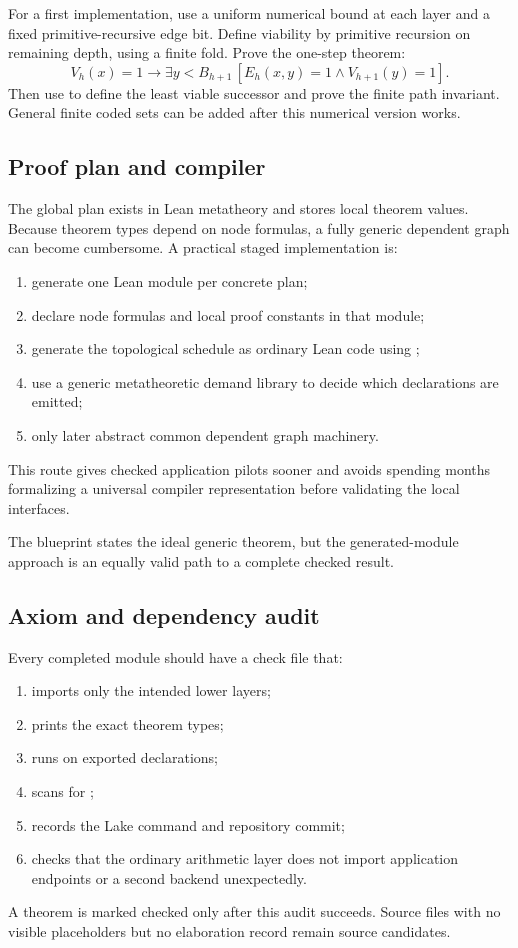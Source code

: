 For a first implementation, use a uniform numerical bound at each layer and a
fixed primitive-recursive edge bit.  Define viability by primitive recursion on
remaining depth, using a finite  fold.  Prove the one-step theorem:
\[
  V_h(x)=1\to
  \exists y<B_{h+1}\,[E_h(x,y)=1\wedge V_{h+1}(y)=1].
\]
Then use  to define the least viable successor and
prove the finite path invariant.  General finite coded sets can be added after
this numerical version works.

\subsection{Proof plan and compiler}

The global plan exists in Lean metatheory and stores local theorem values.
Because theorem types depend on node formulas, a fully generic dependent graph
can become cumbersome.  A practical staged implementation is:
\begin{enumerate}
  \item generate one Lean module per concrete plan;
  \item declare node formulas and local proof constants in that module;
  \item generate the topological schedule as ordinary Lean code using
        ;
  \item use a generic metatheoretic demand library to decide which declarations
        are emitted;
  \item only later abstract common dependent graph machinery.
\end{enumerate}
This route gives checked application pilots sooner and avoids spending months
formalizing a universal compiler representation before validating the local
interfaces.

The blueprint  states the ideal
generic theorem, but the generated-module approach is an equally valid path to
a complete checked result.

\subsection{Axiom and dependency audit}

Every completed module should have a check file that:
\begin{enumerate}
  \item imports only the intended lower layers;
  \item prints the exact theorem types;
  \item runs  on exported declarations;
  \item scans for ;
  \item records the Lake command and repository commit;
  \item checks that the ordinary arithmetic layer does not import application
        endpoints or a second backend unexpectedly.
\end{enumerate}
A theorem is marked checked only after this audit succeeds.  Source files with
no visible placeholders but no elaboration record remain source candidates.

